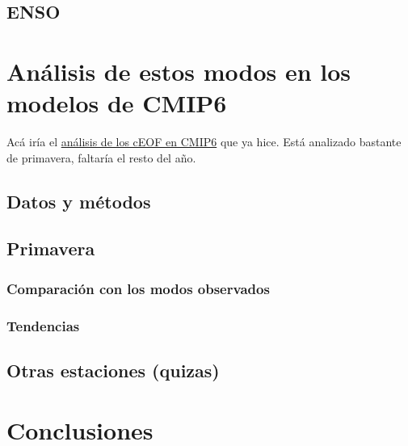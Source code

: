 \documentclass[12pt,oneside]{reedthesis}
\begin{document}
\hypertarget{enso}{%
\subsection{ENSO}\label{enso}}

\hypertarget{anuxe1lisis-de-estos-modos-en-los-modelos-de-cmip6}{%
\section{Análisis de estos modos en los modelos de CMIP6}\label{anuxe1lisis-de-estos-modos-en-los-modelos-de-cmip6}}

Acá iría el \href{https://htmlpreview.github.io/?https://github.com/eliocamp/onda3/blob/master/35-cEOF-CMIP6-superensemble-SON.html}{análisis de los cEOF en CMIP6} que ya hice. Está analizado bastante de primavera, faltaría el resto del año.

\hypertarget{datos-y-muxe9todos-3}{%
\subsection{Datos y métodos}\label{datos-y-muxe9todos-3}}

\hypertarget{primavera-1}{%
\subsection{Primavera}\label{primavera-1}}

\hypertarget{comparaciuxf3n-con-los-modos-observados}{%
\subsubsection{Comparación con los modos observados}\label{comparaciuxf3n-con-los-modos-observados}}

\hypertarget{tendencias}{%
\subsubsection{Tendencias}\label{tendencias}}

\hypertarget{otras-estaciones-quizas}{%
\subsection{Otras estaciones (quizas)}\label{otras-estaciones-quizas}}

\hypertarget{conclusiones}{%
\section{Conclusiones}\label{conclusiones}}
\end{document}
